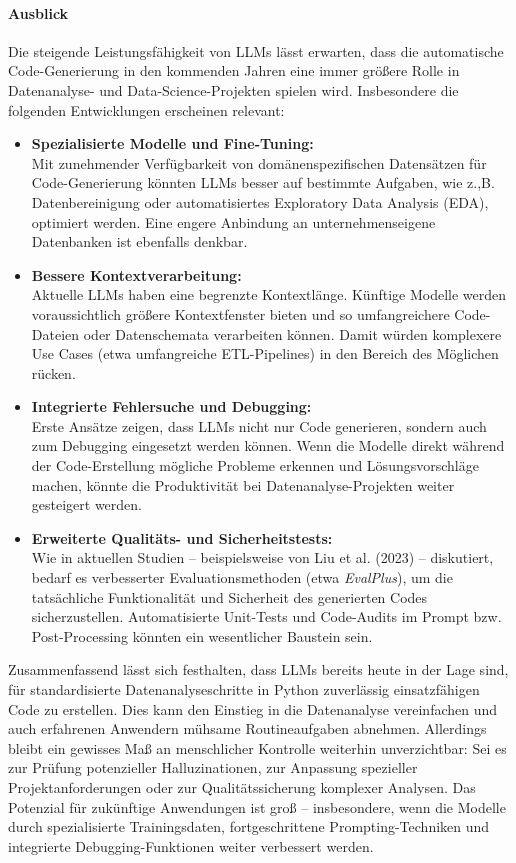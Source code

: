 \documentclass[11pt,a4paper]{article}
\begin{document}
\paragraph{Ausblick}
Die steigende Leistungsfähigkeit von LLMs lässt erwarten, dass die automatische Code-Generierung in den kommenden Jahren eine immer größere Rolle in Datenanalyse- und Data-Science-Projekten spielen wird. Insbesondere die folgenden Entwicklungen erscheinen relevant:

\begin{itemize} 
    \item \textbf{Spezialisierte Modelle und Fine-Tuning:}\\Mit zunehmender Verfügbarkeit von domänenspezifischen Datensätzen für Code-Generierung könnten LLMs besser auf bestimmte Aufgaben, wie z.,B. Datenbereinigung oder automatisiertes Exploratory Data Analysis (EDA), optimiert werden. Eine engere Anbindung an unternehmenseigene Datenbanken ist ebenfalls denkbar.
    \item \textbf{Bessere Kontextverarbeitung:}\\Aktuelle LLMs haben eine begrenzte Kontextlänge. Künftige Modelle werden voraussichtlich größere Kontextfenster bieten und so umfangreichere Code-Dateien oder Datenschemata verarbeiten können. Damit würden komplexere Use Cases (etwa umfangreiche ETL-Pipelines) in den Bereich des Möglichen rücken.
    \item \textbf{Integrierte Fehlersuche und Debugging:}\\Erste Ansätze zeigen, dass LLMs nicht nur Code generieren, sondern auch zum Debugging eingesetzt werden können. Wenn die Modelle direkt während der Code-Erstellung mögliche Probleme erkennen und Lösungsvorschläge machen, könnte die Produktivität bei Datenanalyse-Projekten weiter gesteigert werden.
    \item \textbf{Erweiterte Qualitäts- und Sicherheitstests:}\\Wie in aktuellen Studien – beispielsweise von Liu et al. (2023) – diskutiert, bedarf es verbesserter Evaluationsmethoden (etwa \emph{EvalPlus}), um die tatsächliche Funktionalität und Sicherheit des generierten Codes sicherzustellen. Automatisierte Unit-Tests und Code-Audits im Prompt bzw. Post-Processing könnten ein wesentlicher Baustein sein.
\end{itemize}

\noindent Zusammenfassend lässt sich festhalten, dass LLMs bereits heute in der Lage sind, für standardisierte Datenanalyseschritte in Python zuverlässig einsatzfähigen Code zu erstellen. Dies kann den Einstieg in die Datenanalyse vereinfachen und auch erfahrenen Anwendern mühsame Routineaufgaben abnehmen. Allerdings bleibt ein gewisses Maß an menschlicher Kontrolle weiterhin unverzichtbar: Sei es zur Prüfung potenzieller Halluzinationen, zur Anpassung spezieller Projektanforderungen oder zur Qualitätssicherung komplexer Analysen. Das Potenzial für zukünftige Anwendungen ist groß – insbesondere, wenn die Modelle durch spezialisierte Trainingsdaten, fortgeschrittene Prompting-Techniken und integrierte Debugging-Funktionen weiter verbessert werden.
\end{document}
